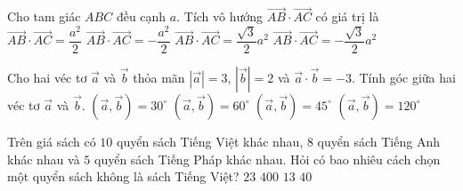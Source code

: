 \begin{ex}%
Cho tam giác $A B C$ đều cạnh $a$. Tích vô hướng $\overrightarrow{A B}\cdot \overrightarrow{A C}$ có giá trị là
\choice
{\True $\overrightarrow{A B}\cdot \overrightarrow{A C}=\dfrac{a^2}{2}$}
{$\overrightarrow{A B}\cdot \overrightarrow{A C}=-\dfrac{a^2}{2}$}
{$\overrightarrow{A B}\cdot \overrightarrow{A C}=\dfrac{\sqrt{3}}{2}a^2$}
{$\overrightarrow{A B}\cdot \overrightarrow{A C}=-\dfrac{\sqrt{3}}{2}a^2$}
\end{ex}

\begin{ex}%
Cho hai véc tơ $\overrightarrow{a}$ và $\overrightarrow{b}$ thỏa mãn $\left|\overrightarrow{a}\right|=3$, $\left|\overrightarrow{b}\right|=2$ và $\overrightarrow{a}\cdot \overrightarrow{b}=-3$. Tính góc giữa hai véc tơ $\overrightarrow{a}$ và $\overrightarrow{b}$.
\choice
{$\left(\overrightarrow{a},\overrightarrow{b}\right)=30^{\circ}$}
{$\left(\overrightarrow{a},\overrightarrow{b}\right)=60^{\circ}$}
{$\left(\overrightarrow{a},\overrightarrow{b}\right)=45^{\circ}$}
{\True $\left(\overrightarrow{a},\overrightarrow{b}\right)=120^{\circ}$}
\end{ex}

\begin{ex}%
Trên giá sách có $10$ quyển sách Tiếng Việt khác nhau, $8$ quyển sách Tiếng Anh khác nhau và $5$ quyển sách Tiếng Pháp khác nhau. Hỏi có bao nhiêu cách chọn một quyển sách không là sách Tiếng Việt?
\choice
{$23$}
{$400$}
{\True $13$}
{$40$}
\end{ex}

